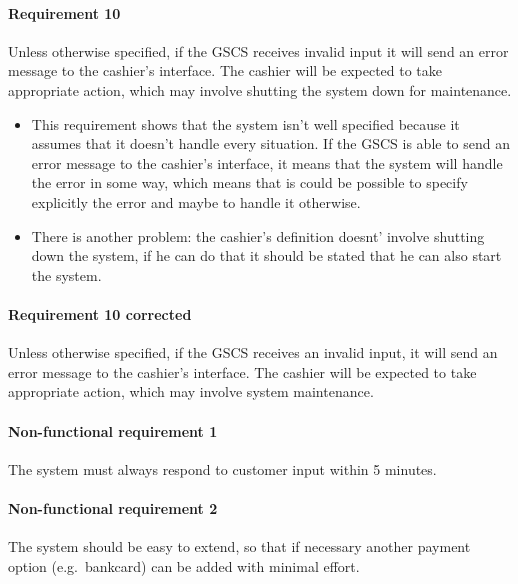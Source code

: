 \paragraph{Requirement 10} Unless otherwise specified, if the GSCS receives
invalid input it will send an error message to the cashier's interface.
The cashier will be expected to take appropriate action, which may
involve shutting the system down for maintenance.

\begin{framed}
    \begin{itemize}
        \item This requirement shows that the system isn't well specified
        because it assumes that it doesn't handle every situation. If the GSCS
        is able to send an error message to the cashier's interface, it means
        that the system will handle the error in some way, which means that
        is could be possible to specify explicitly the error and maybe to
        handle it otherwise.
        \item There is another problem: the cashier's definition doesnt' involve
        shutting down the system, if he can do that it should be stated that he
        can also start the system.
    \end{itemize}

    \paragraph{Requirement 10 corrected} Unless otherwise specified, if the GSCS
    receives an invalid input, it will send an error message to the cashier's
    interface. The cashier will be expected to take appropriate action, which
    may involve system maintenance.
\end{framed}

\paragraph{Non-functional requirement 1} The system must always respond to
customer input within 5 minutes.

\paragraph{Non-functional requirement 2} The system should be easy to
extend, so that if necessary another payment option (e.g.\ bankcard) can be
added with minimal effort.

